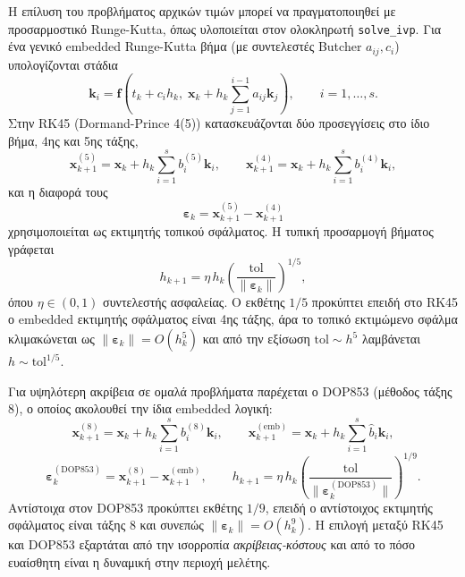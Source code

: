 \documentclass[11pt,a4paper]{report}
\begin{document}
Η επίλυση του προβλήματος αρχικών τιμών μπορεί να πραγματοποιηθεί με προσαρμοστικό
Runge-Kutta, όπως υλοποιείται στον ολοκληρωτή \texttt{solve\_ivp}.
Για ένα γενικό embedded Runge-Kutta βήμα (με συντελεστές Butcher $a_{ij},c_i$)
υπολογίζονται στάδια
\begin{equation}
\mathbf{k}_i=\mathbf{f}\!\left(t_k+c_i h_k,\;\mathbf{x}_k+h_k\sum_{j=1}^{i-1}a_{ij}\mathbf{k}_j\right),
\qquad i=1,\dots,s.
\end{equation}
Στην RK45 (Dormand-Prince 4(5)) κατασκευάζονται δύο προσεγγίσεις στο ίδιο βήμα,
4ης και 5ης τάξης,
\begin{equation}
\mathbf{x}_{k+1}^{(5)}=\mathbf{x}_k+h_k\sum_{i=1}^{s}b_i^{(5)}\mathbf{k}_i,
\qquad
\mathbf{x}_{k+1}^{(4)}=\mathbf{x}_k+h_k\sum_{i=1}^{s}b_i^{(4)}\mathbf{k}_i,
\end{equation}
και η διαφορά τους
\begin{equation}
\boldsymbol{\varepsilon}_k=\mathbf{x}_{k+1}^{(5)}-\mathbf{x}_{k+1}^{(4)}
\end{equation}
χρησιμοποιείται ως εκτιμητής τοπικού σφάλματος. Η τυπική προσαρμογή βήματος γράφεται
\begin{equation}
h_{k+1}=\eta\,h_k\left(\frac{\mathrm{tol}}{\|\boldsymbol{\varepsilon}_k\|}\right)^{\!1/5},
\end{equation}
όπου $\eta\in(0,1)$ συντελεστής ασφαλείας.
Ο εκθέτης $1/5$ προκύπτει επειδή στο RK45 ο embedded εκτιμητής σφάλματος είναι
4ης τάξης, άρα το τοπικό εκτιμώμενο σφάλμα κλιμακώνεται ως
$\|\boldsymbol{\varepsilon}_k\|=O(h_k^{5})$ και από την εξίσωση
$\mathrm{tol}\sim h^{5}$ λαμβάνεται $h\sim \mathrm{tol}^{1/5}$.

Για υψηλότερη ακρίβεια σε ομαλά προβλήματα παρέχεται ο DOP853 (μέθοδος τάξης 8),
ο οποίος ακολουθεί την ίδια embedded λογική:
\begin{equation}
\mathbf{x}_{k+1}^{(8)}=\mathbf{x}_k+h_k\sum_{i=1}^{s}b_i^{(8)}\mathbf{k}_i,
\qquad
\mathbf{x}_{k+1}^{(\mathrm{emb})}=\mathbf{x}_k+h_k\sum_{i=1}^{s}\widehat b_i\mathbf{k}_i,
\end{equation}
\begin{equation}
\boldsymbol{\varepsilon}_k^{\mathrm{(DOP853)}}=
\mathbf{x}_{k+1}^{(8)}-\mathbf{x}_{k+1}^{(\mathrm{emb})},
\qquad
h_{k+1}=\eta\,h_k\left(\frac{\mathrm{tol}}{\|\boldsymbol{\varepsilon}_k^{\mathrm{(DOP853)}}\|}\right)^{\!1/9}.
\end{equation}
Αντίστοιχα στον DOP853 προκύπτει εκθέτης $1/9$, επειδή ο αντίστοιχος εκτιμητής
σφάλματος είναι τάξης 8 και συνεπώς $\|\boldsymbol{\varepsilon}_k\|=O(h_k^{9})$.
Η επιλογή μεταξύ RK45 και DOP853 εξαρτάται από την ισορροπία
\emph{ακρίβειας-κόστους} και από το πόσο ευαίσθητη είναι η δυναμική
στην περιοχή μελέτης.
\end{document}

